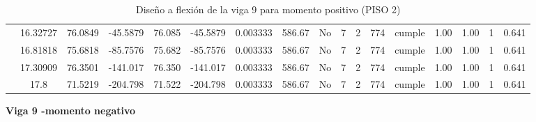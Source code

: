 \begin{table}[H]
{\begin{tabular}{|c|c|c|c|c|c|c|c|c|c|c|c|c|c|c|c|c|}
\cline{2-17}        & 16.32727 & 76.0849 & -45.5879 & 76.085 & -45.5879 & 0.003333 & 586.67 & No  & 7   & 2   & 774 & \cellcolor[rgb]{ .776,  .937,  .808}cumple & 1.00 & 1.00 & 1   & 0.641 \bigstrut\\
\cline{2-17}        & 16.81818 & 75.6818 & -85.7576 & 75.682 & -85.7576 & 0.003333 & 586.67 & No  & 7   & 2   & 774 & \cellcolor[rgb]{ .776,  .937,  .808}cumple & 1.00 & 1.00 & 1   & 0.641 \bigstrut\\
\cline{2-17}        & 17.30909 & 76.3501 & -141.017 & 76.350 & -141.017 & 0.003333 & 586.67 & No  & 7   & 2   & 774 & \cellcolor[rgb]{ .776,  .937,  .808}cumple & 1.00 & 1.00 & 1   & 0.641 \bigstrut\\
\cline{2-17}        & 17.8 & 71.5219 & -204.798 & 71.522 & -204.798 & 0.003333 & 586.67 & No  & 7   & 2   & 774 & \cellcolor[rgb]{ .776,  .937,  .808}cumple & 1.00 & 1.00 & 1   & 0.641 \bigstrut\\
    \hline
    \end{tabular}%
  
  
  
}%
    \caption{Diseño a flexión de la viga 9 para momento positivo (PISO 2) }
  \label{tab:F VG9 P2 M+}%
\end{table}%
\newpage
\textbf{Viga 9 -momento negativo}
